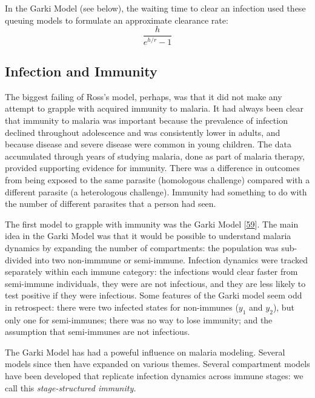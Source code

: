 \documentclass[
]{book}
\begin{document}
In the Garki Model (see below), the waiting time to clear an infection used these queuing models to formulate an approximate clearance rate: \[ \frac{h}{e^{h/r}-1}\]

\hypertarget{infection-and-immunity}{%
\subsection{Infection and Immunity}\label{infection-and-immunity}}

The biggest failing of Ross's model, perhaps, was that it did not make any attempt to grapple with acquired immunity to malaria. It had always been clear that immunity to malaria was important because the prevalence of infection declined throughout adolescence and was consistently lower in adults, and because disease and severe disease were common in young children. The data accumulated through years of studying malaria, done as part of malaria therapy, provided supporting evidence for immunity. There was a difference in outcomes from being exposed to the same parasite (homologous challenge) compared with a different parasite (a heterologous challenge). Immunity had something to do with the number of different parasites that a person had seen.

The first model to grapple with immunity was the Garki Model {[}\protect\hyperlink{ref-DietzK1974GarkiModel}{59}{]}. The main idea in the Garki Model was that it would be possible to understand malaria dynamics by expanding the number of compartments: the population was sub-divided into two non-immmune or semi-immune. Infection dynamics were tracked separately within each immune category: the infections would clear faster from semi-immune individuals, they were are not infectious, and they are less likely to test positive if they were infectious. Some features of the Garki model seem odd in retrospect: there were two infected states for non-immunes (\(y_1\) and \(y_2\)), but only one for semi-immunes; there was no way to lose immunity; and the assumption that semi-immunes are not infectious.

The Garki Model has had a poweful influence on malaria modeling. Several models since then have expanded on various themes. Several compartment models have been developed that replicate infection dynamics across immune stages: we call this \emph{stage-structured immunity.}
\end{document}
